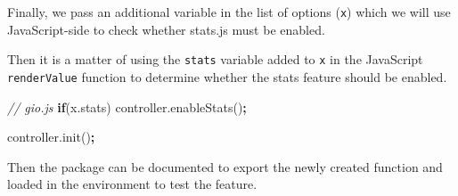 \documentclass[10pt,]{krantz}
\makeatletter
\newenvironment{Shaded}{\begin{snugshade}}{\end{snugshade}}
\newcommand{\AttributeTok}[1]{\textcolor[rgb]{0.61,0.61,0.61}{#1}}
\newcommand{\CommentTok}[1]{\textcolor[rgb]{0.37,0.37,0.37}{\textit{#1}}}
\newcommand{\ControlFlowTok}[1]{\textcolor[rgb]{0.27,0.27,0.27}{\textbf{#1}}}
\newcommand{\DataTypeTok}[1]{\textcolor[rgb]{0.27,0.27,0.27}{#1}}
\newcommand{\KeywordTok}[1]{\textcolor[rgb]{0.27,0.27,0.27}{\textbf{#1}}}
\newcommand{\NormalTok}[1]{#1}
\newcommand{\OperatorTok}[1]{\textcolor[rgb]{0.43,0.43,0.43}{\textbf{#1}}}
\newcommand{\OtherTok}[1]{\textcolor[rgb]{0.37,0.37,0.37}{#1}}
\newcommand{\StringTok}[1]{\textcolor[rgb]{0.5,0.5,0.5}{#1}}
\newcommand{\VariableTok}[1]{\textcolor[rgb]{0,0,0}{#1}}
\newenvironment{kframe}{%
\medskip{}
\setlength{\fboxsep}{.8em}
 \def\at@end@of@kframe{}%
 \ifinner\ifhmode%
  \def\at@end@of@kframe{\end{minipage}}%
  \begin{minipage}{\columnwidth}%
 \fi\fi%
 \def\FrameCommand##1{\hskip\@totalleftmargin \hskip-\fboxsep
 \colorbox{shadecolor}{##1}\hskip-\fboxsep
     \hskip-\linewidth \hskip-\@totalleftmargin \hskip\columnwidth}%
 \MakeFramed {\advance\hsize-\width
   \@totalleftmargin\z@ \linewidth\hsize
   \@setminipage}}%
 {\par\unskip\endMakeFramed%
 \at@end@of@kframe}
\renewenvironment{Shaded}{\begin{kframe}}{\end{kframe}}
\makeatother
\begin{document}
Finally, we pass an additional variable in the list of options (\texttt{x}) which we will use JavaScript-side to check whether stats.js must be enabled.

\begin{Shaded}
\end{Shaded}

Then it is a matter of using the \texttt{stats} variable added to \texttt{x} in the JavaScript \texttt{renderValue} function to determine whether the stats feature should be enabled.

\begin{Shaded}
\begin{Highlighting}[]
\CommentTok{// gio.js}
\ControlFlowTok{if}\NormalTok{(}\VariableTok{x}\NormalTok{.}\AttributeTok{stats}\NormalTok{)}
  \VariableTok{controller}\NormalTok{.}\AttributeTok{enableStats}\NormalTok{()}\OperatorTok{;}

\VariableTok{controller}\NormalTok{.}\AttributeTok{init}\NormalTok{()}\OperatorTok{;}
\end{Highlighting}
\end{Shaded}

Then the package can be documented to export the newly created function and loaded in the environment to test the feature.
\end{document}
